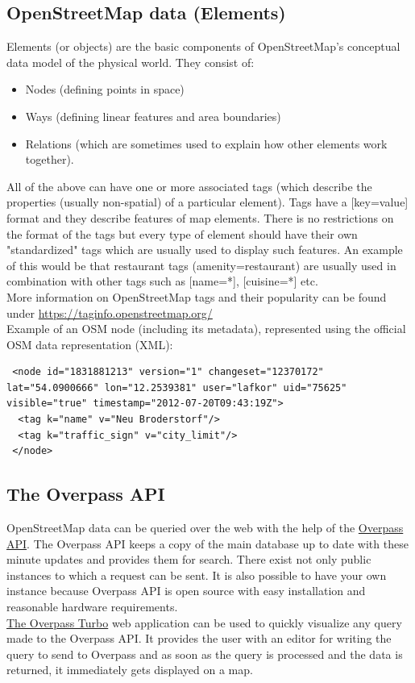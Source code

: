 \subsection{OpenStreetMap data (Elements)}
Elements (or objects) are the basic components of OpenStreetMap's conceptual data model of the physical world. They consist of:
\begin{itemize}
    \item Nodes (defining points in space)
    \item Ways (defining linear features and area boundaries)
    \item Relations (which are sometimes used to explain how other elements work together).
\end{itemize}
All of the above can have one or more associated tags (which describe the properties (usually non-spatial) of a particular element). \cite{OSMElements}
Tags have a [key=value] format and they describe features of map elements.
There is no restrictions on the format of the tags but every type of element should have their own "standardized" tags which
are usually used to display such features.
An example of this would be that restaurant tags (amenity=restaurant) are usually used
in combination with other tags such as [name=*], [cuisine=*] etc.\\
\newline
More information on OpenStreetMap tags and their popularity can be found under \href{https://taginfo.openstreetmap.org/}{https://taginfo.openstreetmap.org/}\\
\newline
Example of an OSM node (including its metadata), represented using the official OSM data representation (XML):
\begin{verbatim}
 <node id="1831881213" version="1" changeset="12370172" lat="54.0900666" lon="12.2539381" user="lafkor" uid="75625" visible="true" timestamp="2012-07-20T09:43:19Z">
  <tag k="name" v="Neu Broderstorf"/>
  <tag k="traffic_sign" v="city_limit"/>
 </node>
\end{verbatim}
\subsection{The Overpass API}
OpenStreetMap data can be queried over the web with the help of the \href{https://wiki.openstreetmap.org/wiki/Overpass_API}{Overpass API}.
The Overpass API keeps a copy of the main database up to date with these minute updates and provides them for search.
There exist not only public instances to which a request can be sent.
It is also possible to have your own instance because Overpass API is open source
with easy installation and reasonable hardware requirements. \cite{WhatIsOverpassAPI}\\
\newline
\href{https://overpass-turbo.eu/}{The Overpass Turbo} web application can be used to quickly visualize any query made to the Overpass API.
It provides the user with an editor for writing the query to send to Overpass and as soon as the query is processed and the data is returned,
it immediately gets displayed on a map.\\
\newline
